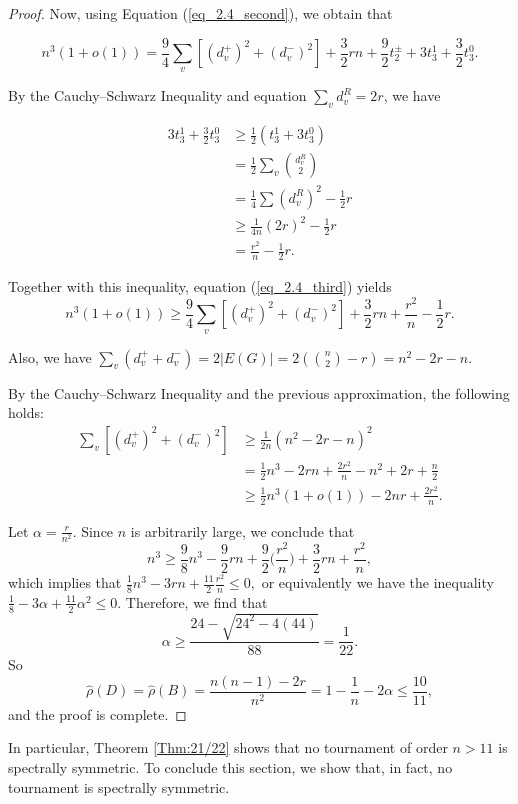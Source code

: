 \documentclass[11pt]{article}
\theoremstyle{plain}
\newcommand{\ssymend}[0]{spectrally symmetric}
\begin{document}
\begin{proof}
Now, using Equation (\ref{eq_2.4_second}), we obtain that 

\begin{equation} \label{eq_2.4_third}
    n^3(1+o(1))=\frac{9}{4}\sum_v [(d^+_v)^2 + (d^-_v)^2]+\frac{3}{2}rn+\frac{9}{2}t^{\pm}_2 + 3t^1_3 + \frac{3}{2} t^0_3.
\end{equation}

By the Cauchy–Schwarz Inequality and equation $\sum_v d^R_v=2r$, we have

\begin{align*}
3t^1_3 + \frac{3}{2} t^0_3&\geq \frac{1}{2}(t^1_3+3t^0_3)\\&=\frac{1}{2} \sum_v  \binom{d^R_v}{2}\\&= \frac{1}{4} \sum (d^R_v)^2-\frac{1}{2}r\\&\geq \frac{1}{4n}(2r)^2-\frac{1}{2}r\\&=\frac{r^2}{n}-\frac{1}{2}r.    
\end{align*}

Together with this inequality, equation (\ref{eq_2.4_third}) yields $$ n^3(1+o(1))\geq \frac{9}{4}\sum_v [(d^+_v)^2 + (d^-_v)^2]+\frac{3}{2}rn+ \frac{r^2}{n}-\frac{1}{2}r.$$

Also, we have  $\sum_v (d^+_v + d^-_v)=2|E(G)|=2 (\binom{n}{2}-r)= n^2-2r-n.$

By the Cauchy–Schwarz Inequality and the previous approximation, the following holds: \begin{align*}
\sum_v [(d^+_v)^2 + (d^-_v)^2]&\geq \frac{1}{2n} (n^2-2r-n)^2\\&=\frac{1}{2}n^3-2rn+\frac{2r^2}{n}-n^2+2r+\frac{n}{2} \\&\geq\frac{1}{2}n^3(1+o(1))-2nr
+\frac{2r^2}{n}.\end{align*}

Let $\alpha=\frac{r}{n^2}$. Since $n$ is arbitrarily large, we conclude that $$n^3\geq \frac{9}{8}n^3-\frac{9}{2}rn+\frac{9}{2}\Big(\frac{r^2}{n}\Big)+\frac{3}{2}rn+\frac{r^2}{n},$$ which implies that $\frac{1}{8} n^3-3rn +\frac{11}{2}\frac{r^2}{n}\leq0,$ or equivalently we have the inequality $ \frac{1}{8}-3\alpha+\frac{11}{2}\alpha^2\leq 0. $
Therefore, we find that $$\alpha \geq \frac{24-\sqrt {24^2-4(44)}}{88}=\frac {1}{22}.$$ So \[\widehat{\rho}(D)=\widehat{\rho}(B)=\frac{n(n-1)-2r}{n^2}=1-\frac{1}{n}-2\alpha\leq \frac{10}{11},\] and the proof is complete.
\end{proof}


In particular, Theorem \ref{Thm:21/22} shows that no tournament of order $n>11$ is \ssymend. To conclude this section, we show that, in fact, no tournament is \ssymend. 
\end{document}
